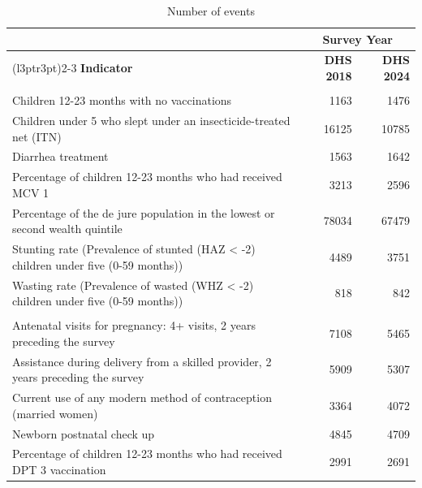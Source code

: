 \documentclass[
]{article}
\begin{document}
\begin{table}[!h]
\centering
\caption{\label{tab:unnamed-chunk-9}Number of events}
\centering
\begin{tabular}[t]{lrr}
\toprule
\multicolumn{1}{c}{ } & \multicolumn{2}{c}{Survey Year} \\
\cmidrule(l{3pt}r{3pt}){2-3}
\textbf{Indicator} & \textbf{DHS 2018} & \textbf{DHS 2024}\\
\midrule
\addlinespace[0.3em]
\multicolumn{3}{l}{\textbf{Child Health}}\\
\hspace{1em}Children 12-23 months with no vaccinations & 1163 & 1476\\
\hspace{1em}Children under 5 who slept under an insecticide-treated net (ITN) & 16125 & 10785\\
\hspace{1em}Diarrhea treatment & 1563 & 1642\\
\hspace{1em}Percentage of children 12-23 months who had received MCV 1 & 3213 & 2596\\
\hspace{1em}Percentage of the de jure population in the lowest or second wealth quintile & 78034 & 67479\\
\hspace{1em}Stunting rate (Prevalence of stunted (HAZ < -2) children under five (0-59 months)) & 4489 & 3751\\
\hspace{1em}Wasting rate (Prevalence of wasted (WHZ < -2) children under five (0-59 months)) & 818 & 842\\
\addlinespace[0.3em]
\multicolumn{3}{l}{\textbf{Maternal Health}}\\
\hspace{1em}Antenatal visits for pregnancy: 4+ visits, 2 years preceding the survey & 7108 & 5465\\
\hspace{1em}Assistance during delivery from a skilled provider, 2 years preceding the survey & 5909 & 5307\\
\hspace{1em}Current use of any modern method of contraception (married women) & 3364 & 4072\\
\hspace{1em}Newborn postnatal check up & 4845 & 4709\\
\hspace{1em}Percentage of children 12-23 months who had received DPT 3 vaccination & 2991 & 2691\\

\end{tabular}
\end{table}
\end{document}
